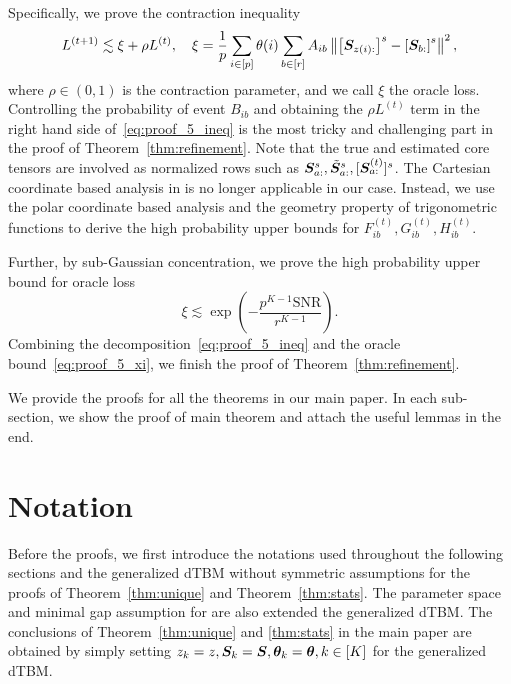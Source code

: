 \documentclass[lettersize,onecolumn,journal]{IEEEtran}
\theoremstyle{definition}
\theoremstyle{definition}
\newcommand{\of}[1]{\left(#1\right)}
\newcommand{\off}[1]{\left[#1\right]}
\begin{document}
{Specifically, we prove the contraction inequality
\begin{equation}\label{eq:proof_5_ineq}
    L^{(t+1)} \lesssim \xi + \rho L^{(t)}, \quad \xi = \frac{1}{p}  \sum_{i \in [p]} \theta(i) \sum_{b \in [r]}  A_{ib} \onorm{ \off{ \mS_{ z(i):}  }^s - \off{ \mS_{b:}  }^s  }^2,
\end{equation}
where $\rho \in (0,1)$ is the contraction parameter, and we call $\xi$ the oracle loss. Controlling the probability of event $B_{ib}$ and obtaining the $\rho L^{(t)}$ term in the right hand side of~\eqref{eq:proof_5_ineq} is the most tricky and challenging part in the proof of Theorem~\ref{thm:refinement}. Note that the true and estimated core tensors are involved as normalized rows such as $\bm S_{a:}^s, \tilde {\bm S}_{a:}^s, [\bm S^{(t)}_{a:}]^s$. The Cartesian coordinate based analysis in \cite{han2020exact} is no longer applicable in our case. Instead, we use the polar coordinate based analysis and the geometry property of trigonometric functions to derive the high probability upper bounds for $F_{ib}^{(t)}, G_{ib}^{(t)}, H_{ib}^{(t)}$. 

Further, by sub-Gaussian concentration, we prove the high probability upper bound for oracle loss
\begin{equation}\label{eq:proof_5_xi}
    \xi  \lesssim \exp\of{- \frac{p^{K-1}\text{SNR}}{r^{K-1}}}.
\end{equation}
Combining the decomposition~\eqref{eq:proof_5_ineq} and the oracle bound~\eqref{eq:proof_5_xi}, we finish the proof of Theorem~\ref{thm:refinement}.

}





\newpage
\appendix


We provide the proofs for all the theorems in our main paper. In each sub-section, we show the proof of main theorem and attach the useful lemmas in the end.

\section*{Notation}
Before the proofs, we first introduce the notations used throughout the following sections and the generalized dTBM without symmetric assumptions for the proofs of Theorem~\ref{thm:unique} and Theorem~\ref{thm:stats}. The parameter space and minimal gap assumption for are also extended the generalized dTBM. The conclusions of Theorem~\ref{thm:unique} and \ref{thm:stats} in the main paper are obtained by simply setting $z_k = z, \bm S_k = \bm S, \boldsymbol{\theta}_k = \boldsymbol{\theta}, k \in [K]$ for the generalized dTBM.
\end{document}
